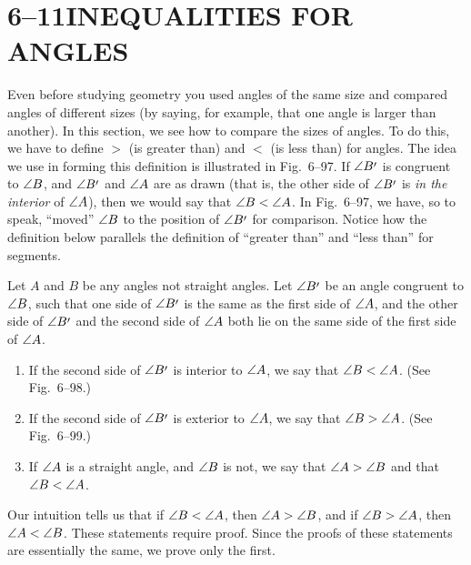 \documentclass[11pt]{book}
\begin{document}
\section*{6--11\quad INEQUALITIES FOR ANGLES}

Even before studying geometry you used angles of the same size and compared
angles of different sizes (by saying, for example, that one angle is larger
than another). In this section, we see how to compare the sizes of angles. To
do this, we have to define $>$ (is greater than) and $<$ (is less than) for
angles. The idea we use in forming this definition is illustrated in
Fig.~6--97. If $\ang{B\VIpr}$ is congruent to $\angle B$, and $\ang{B\VIpr}$ and
$\angle A$ are as drawn (that is, the other side of $\ang{B\VIpr}$ is \emph{in
the interior} of $\angle A$), then we would say that $\angle B < \angle A$. In
Fig.~6--97, we have, so to speak, ``moved'' $\angle B$ to the position of
$\ang{B\VIpr}$ for comparison. Notice how the definition below parallels the
definition of ``greater than'' and ``less than'' for segments.

\FIGVININETYSEVEN

\begin{definition}
Let $A$ and $B$ be any angles not straight angles. Let $\ang{B\VIpr}$ be an
angle congruent to $\angle B$, such that one side of $\ang{B\VIpr}$ is the same
as the first side of $\angle A$, and the other side of $\ang{B\VIpr}$ and the
second side of $\angle A$ both lie on the same side of the first side of
$\angle A$.
\begin{enumerate}[label=(\alph*), leftmargin=2.2em, itemsep=2pt, topsep=3pt]
\item If the second side of $\ang{B\VIpr}$ is interior to $\angle A$, we say
  that $\angle B < \angle A$. (See Fig.~6--98.)
\item If the second side of $\ang{B\VIpr}$ is exterior to $\angle A$, we say
  that $\angle B > \angle A$. (See Fig.~6--99.)
\item If $\angle A$ is a straight angle, and $\angle B$ is not, we say that
  $\angle A > \angle B$ and that $\angle B < \angle A$.
\end{enumerate}
\end{definition}

\FIGVININETYEIGHTNINETYNINE

Our intuition tells us that if $\angle B < \angle A$, then $\angle A > \angle B$,
and if $\angle B > \angle A$, then $\angle A < \angle B$. These statements require
proof. Since the proofs of these statements are essentially the same, we prove
only the first.
\end{document}
